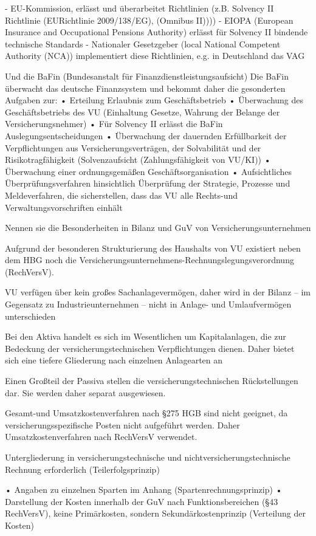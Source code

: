 - EU-Kommission, erlässt und überarbeitet Richtlinien (z.B. Solvency II Richtlinie (EURichtlinie 2009/138/EG), (Omnibus II))))
- EIOPA (European Insurance and Occupational Pensions Authority) erlässt für Solvency II bindende technische
  Standards
- Nationaler Gesetzgeber (local National Competent Authority (NCA)) implementiert diese Richtlinien, e.g. in Deutschland das VAG

Und die BaFin (Bundesanstalt für Finanzdienstleistungsaufsicht)
Die BaFin überwacht das deutsche Finanzsystem und bekommt daher die gesonderten Aufgaben zur:
• Erteilung Erlaubnis zum Geschäftsbetrieb
• Überwachung des Geschäftsbetriebs des VU (Einhaltung
  Gesetze, Wahrung der Belange der Versicherungsnehmer)
• Für Solvency II erlässt die BaFin
  Auslegungsentscheidungen
• Überwachung der dauernden Erfüllbarkeit der Verpflichtungen
  aus Versicherungsverträgen, der Solvabilität und der
  Risikotragfähigkeit (Solvenzaufsicht (Zahlungsfähigkeit von VU/KI))
• Überwachung einer ordnungsgemäßen Geschäftsorganisation
• Aufsichtliches Überprüfungsverfahren hinsichtlich Überprüfung
  der Strategie, Prozesse und Meldeverfahren, die sicherstellen,
  dass das VU alle Rechts-und Verwaltungsvorschriften einhält


Nennen sie die Besonderheiten in Bilanz und GuV von Versicherungsunternehmen

Aufgrund der besonderen Strukturierung des Haushalts von VU 
existiert neben dem HBG noch die Versicherungsunternehmens-Rechnungslegungsverordnung 
(RechVersV).

VU verfügen über kein großes
Sachanlagevermögen, daher wird in der
Bilanz – im Gegensatz zu Industrieunternehmen – nicht in Anlage- und
Umlaufvermögen unterschieden

Bei den Aktiva handelt es sich im
Wesentlichen um Kapitalanlagen, die zur
Bedeckung der versicherungstechnischen
Verpflichtungen dienen. Daher bietet sich eine
tiefere Gliederung nach einzelnen
Anlagearten an

Einen Großteil der Passiva stellen die
versicherungstechnischen Rückstellungen
dar. Sie werden daher separat ausgewiesen.

Gesamt-und Umsatzkostenverfahren nach
§275 HGB sind nicht geeignet, da
versicherungsspezifische Posten nicht
aufgeführt werden. Daher Umsatzkostenverfahren nach RechVersV verwendet.

Untergliederung in versicherungstechnische
und nichtversicherungstechnische
Rechnung erforderlich (Teilerfolgsprinzip)

• Angaben zu einzelnen Sparten im Anhang (Spartenrechnungsprinzip)
• Darstellung der Kosten innerhalb der GuV
  nach Funktionsbereichen (§43 RechVersV),
  keine Primärkosten, sondern
  Sekundärkostenprinzip
  (Verteilung der Kosten)

